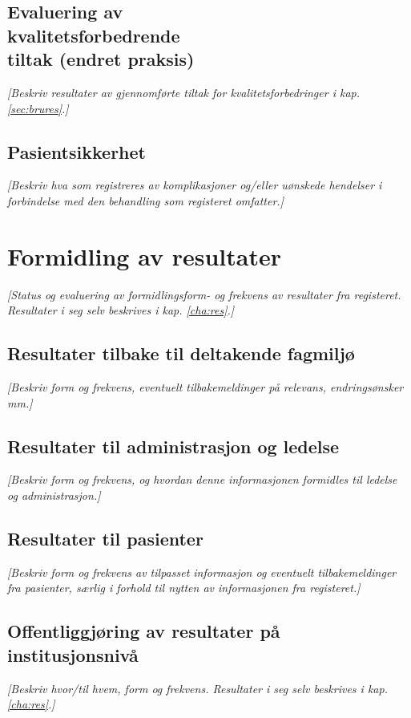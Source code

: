 \documentclass[norsk, a4paper, twocolumn]{report}
\newcommand{\guide}[1] {
	\textit{[\textcolor{guidegray}{#1}]}
	}
\begin{document}
\section{Evaluering av\\kvalitetsforbedrende\\tiltak (endret praksis)}\label{sec:evakva}
\guide{Beskriv resultater av gjennomførte tiltak for kvalitetsforbedringer
i kap. \ref{sec:brures}.}

\section{Pasientsikkerhet}\label{sec:kom}
\guide{Beskriv hva som registreres av komplikasjoner og/eller uønskede
hendelser i forbindelse med den behandling som registeret omfatter.}




\chapter{Formidling av resultater}\label{cha:dat}
\guide{Status og evaluering av formidlingsform- og frekvens
av resultater fra registeret. Resultater i seg selv beskrives i kap.
\ref{cha:res}.}


\section{Resultater tilbake til deltakende fagmiljø}\label{sec:resfag}
\guide{Beskriv form og frekvens,  eventuelt tilbakemeldinger på relevans,
endringsønsker mm.}

\section{Resultater til administrasjon og ledelse}\label{sec:resled}
\guide{Beskriv form og frekvens, og hvordan denne
informasjonen formidles til ledelse og administrasjon.}

\section{Resultater til pasienter}\label{sec:respas}
\guide{Beskriv form og frekvens av tilpasset informasjon og eventuelt
tilbakemeldinger fra pasienter, særlig i forhold til nytten av informasjonen
fra registeret.}

\section{Offentliggjøring av resultater på institusjonsnivå}\label{sec:off}
\guide{Beskriv hvor/til hvem, form og frekvens. Resultater i seg selv beskrives i kap. \ref{cha:res}.}
\end{document}
